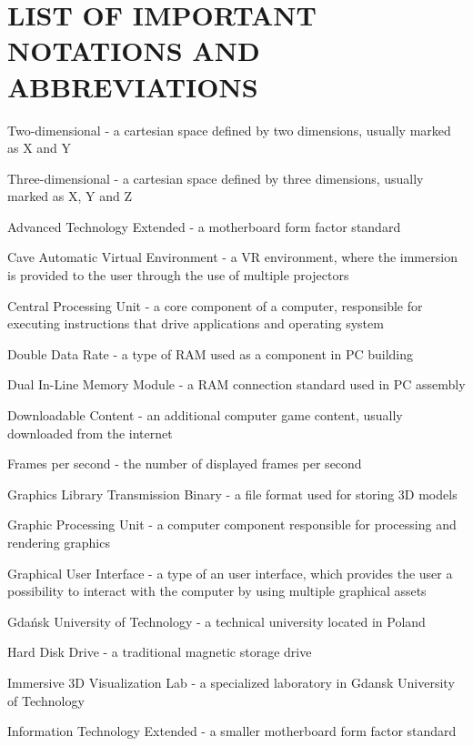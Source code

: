 \chapter*{LIST OF IMPORTANT NOTATIONS AND ABBREVIATIONS}


\begin{abbrev}
\item[2D] Two-dimensional - a cartesian space defined by two dimensions, usually marked as X and Y
\item[3D] Three-dimensional - a cartesian space defined by three dimensions, usually marked as X, Y and Z
\item[ATX] Advanced Technology Extended - a motherboard form factor standard
\item[CAVE] Cave Automatic Virtual Environment - a VR environment, where the immersion is provided to the user through the use of multiple projectors
\item[CPU] Central Processing Unit - a core component of a computer, responsible for executing instructions that drive applications and operating system
\item[DDR] Double Data Rate - a type of RAM used as a component in PC building
\item[DIMM] Dual In-Line Memory Module - a RAM connection standard used in PC assembly
\item[DLC] Downloadable Content - an additional computer game content, usually downloaded from the internet
\item[FPS] Frames per second - the number of displayed frames per second
\item[GLB] Graphics Library Transmission Binary - a file format used for storing 3D models
\item[GPU] Graphic Processing Unit - a computer component responsible for processing and rendering graphics
\item[GUI] Graphical User Interface - a type of an user interface, which provides the user a possibility to interact with the computer by using multiple graphical assets
\item[GUT] Gdańsk University of Technology - a technical university located in Poland
\item[HDD] Hard Disk Drive - a traditional magnetic storage drive
\item[I3DVL] Immersive 3D Visualization Lab - a specialized laboratory in Gdansk University of Technology
\item[ITX] Information Technology Extended - a smaller motherboard form factor standard

\end{abbrev}
